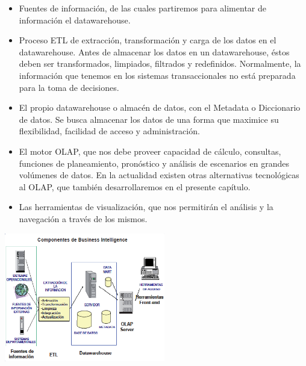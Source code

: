 \documentclass[twoside,twocolumn]{article}
\begin{document}
\begin{itemize}
    \item   Fuentes de información, de las cuales partiremos para alimentar de información el datawarehouse.
    \item   Proceso ETL de extracción, transformación y carga de los datos en el datawarehouse. Antes de almacenar los datos en un datawarehouse, éstos deben ser transformados, limpiados, filtrados y redefinidos. Normalmente, la información que tenemos en los sistemas transaccionales no está preparada para la toma de decisiones. 
    \item  El propio datawarehouse o almacén de datos, con el Metadata o Diccionario de datos. Se busca almacenar los datos de una forma que maximice su flexibilidad, facilidad de acceso y administración. 
    \item   El motor OLAP, que nos debe proveer capacidad de cálculo, consultas, funciones de planeamiento, pronóstico y análisis de escenarios en grandes volúmenes de datos. En la actualidad existen otras alternativas tecnológicas al OLAP, que también desarrollaremos en el presente capítulo. 
    \item   Las herramientas de visualización, que nos permitirán el análisis y la navegación a través de los mismos. 
    
\end{itemize}
\includegraphics[width=7cm]{imagenes/data.png}
\end{document}
